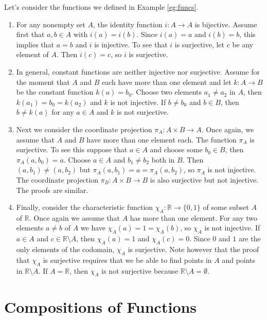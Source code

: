 \begin{example}
Let's consider the functions we defined in Example \ref{eg:funcs}.
\begin{enumerate}
\item For any nonempty set $A$, the identity function $i:A\to A$ is bijective. Assume first that $a,b\in A$ with $i(a)=i(b)$.  Since $i(a)=a$ and $i(b)=b$, this implies that $a=b$ and $i$ is injective.  To see that $i$ is surjective, let $c$ be any element of $A$.  Then $i(c)=c$, so $i$ is surjective.
\item In general, constant functions are neither injective nor surjective. Assume for the moment that $A$ and $B$ each have more than one element and let $k:A\to B$ be the constant function $k(a)=b_0$.  Choose two elements $a_1\neq a_2$ in $A$, then $k(a_1)=b_0=k(a_2)$ and $k$ is not injective.  If $b\neq b_0$ and $b\in B$, then $b\neq k(a)$ for any $a\in A$ and $k$ is not surjective.
\item Next we consider the coordinate projection $\pi_A:A\times B\to A$.  Once again, we assume that $A$ and $B$ have more than one element each. The function $\pi_A$ is surjective.  To see this suppose that $a\in A$ and choose some $b_0\in B$, then $\pi_A(a,b_0)=a$. Choose $a\in A$ and $b_1\neq b_2$ both in $B$.  Then $(a,b_1)\neq (a,b_2)$ but $\pi_A(a,b_1)=a=\pi_A(a,b_2)$, so $\pi_A$ is not injective.  The coordinate projection $\pi_B:A\times B\to B$ is also surjective but not injective.  The proofs are similar.
\item Finally, consider the characteristic function $\chi_A:\mathbb R\to\{0,1\}$ of some subset $A$ of $\mathbb R$.  Once again we assume that $A$ has more than one element.  For any two elements $a\neq b$ of $A$ we have $\chi_A(a)=1=\chi_A(b)$, so $\chi_A$ is not injective.  If $a\in A$ and $c\in \mathbb R\setminus A$, then $\chi_A(a)=1$ and $\chi_A(c)=0$.  Since $0$ and $1$ are the only elements of the codomain, $\chi_A$ is surjective.  Note however that the proof that $\chi_A$ is surjective requires that we be able to find points in $A$ and points in
$\mathbb R\setminus A$.  If $A=\mathbb R$, then $\chi_A$ is not surjective because $\mathbb R\setminus A=\emptyset$.
\end{enumerate}
\end{example}

\section{Compositions of Functions}


